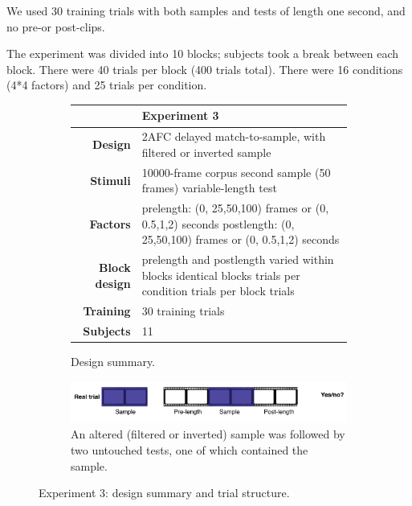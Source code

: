 We used 30 training trials with both samples and tests of length one second, and no pre-or post-clips.

The experiment was divided into 10 blocks; subjects took a break between each block. There were 40 trials per block (400 trials total). There were 16 conditions (4*4 factors) and 25 trials per condition.


\begin{figure}[H]
\centering
\renewcommand{\arraystretch}{1.8}

      \begin{subfigure}[b]{\textwidth}
\begin{tabular}{ >{\bfseries}r | p{8cm}   }
& \textbf{Experiment 3}\\
\hline
  
Design & 2AFC delayed match-to-sample, with filtered or inverted sample\\                   
Stimuli & 10000-frame corpus\newline
		1 second sample (50 frames)\newline
		variable-length test\\
Factors & prelength:\newline
		(0, 25,50,100) frames or (0, 0.5,1,2) seconds\newline
		postlength:\newline
		(0, 25,50,100) frames or (0, 0.5,1,2) seconds\newline\\

Block design & prelength and postlength varied within blocks\newline
		10 identical blocks\newline
25 trials per condition \newline
40 trials per block \newline
400 trials \\
Training &30 training trials \\
Subjects&11\\
\end{tabular}
\caption{Design summary.}
   \end{subfigure}

\begin{subfigure}[b]{\textwidth}
\centering
                \includegraphics[width=12cm]{img/protocolfire18.png}
                \caption{An altered (filtered or inverted) sample was followed by two untouched tests, one of which contained the sample.}     
        \end{subfigure}
\caption{Experiment 3: design summary and trial structure.}
\end{figure}

